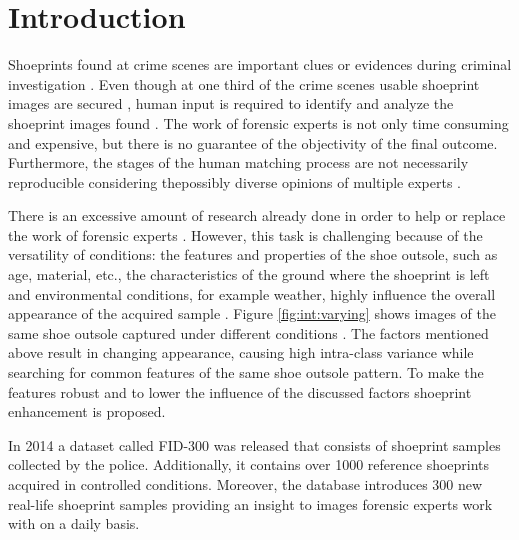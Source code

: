 \documentclass[draft,final]{vutinfth} %
\begin{document}
\chapter{Introduction}
\raggedbottom
\par
Shoeprints found at crime scenes are important clues or evidences during criminal investigation \cite{kong2014novel}.
Even though at one third of the crime scenes usable shoeprint images are secured \cite{alexandre1996computerized}, human input is required to identify and analyze the shoeprint images found \cite{wang2014automatic}.
The work of forensic experts is not only time consuming and expensive, but there is no guarantee of the objectivity of the final outcome\cite{gueham2008automatic}.
Furthermore, the stages of the human matching process are not necessarily reproducible considering thepossibly diverse opinions of multiple experts \cite{damary2018dependence}.
\par
There is an excessive amount of research already done in order to help or replace the work of forensic experts \cite{rida2019forensic}. 
However, this task is challenging because of the versatility of conditions: the features and properties of the shoe outsole, such as age, material, etc., the characteristics of the ground where the shoeprint is left and environmental conditions, for example weather, highly influence the overall appearance of the acquired sample \cite{kortylewski2014unsupervised}.
Figure \ref{fig:int:varying} shows images of the same shoe outsole captured under different conditions \cite{kortylewski2014unsupervised}. 
The factors mentioned above result in changing appearance, causing high intra-class variance while searching for common features of the same shoe outsole pattern.
To make the features robust and to lower the influence of the discussed factors shoeprint enhancement is proposed.
\par
In 2014 a dataset called FID-300 \cite{kortylewski2014unsupervised} was released that consists of shoeprint samples collected by the police. 
Additionally, it contains over 1000 reference shoeprints acquired in controlled conditions.
Moreover, the database introduces 300 new real-life shoeprint samples providing an insight to images forensic experts work with on a daily basis.
\end{document}
